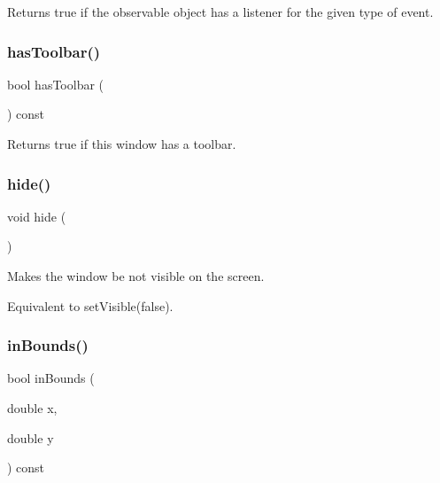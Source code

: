 Returns true if the observable object has a listener for the given type of event. 

\mbox{\label{classsgl_1_1GWindow_af69d0a7ce84cbbef65e40d861ef097c5}} 
\subsubsection{\texorpdfstring{has\+Toolbar()}{hasToolbar()}}
{\footnotesize\ttfamily bool has\+Toolbar (\begin{DoxyParamCaption}{ }\end{DoxyParamCaption}) const\hspace{0.3cm}{\ttfamily [virtual]}}



Returns true if this window has a toolbar. 

\mbox{\label{classsgl_1_1GWindow_ade42eb4da4eb77db85a8d1e4b92e7be4}} 
\subsubsection{\texorpdfstring{hide()}{hide()}}
{\footnotesize\ttfamily void hide (\begin{DoxyParamCaption}{ }\end{DoxyParamCaption})\hspace{0.3cm}{\ttfamily [virtual]}}



Makes the window be not visible on the screen. 

Equivalent to set\+Visible(false). \mbox{\label{classsgl_1_1GWindow_afc480f652b8c5f1fb255e2269ce68879}} 
\subsubsection{\texorpdfstring{in\+Bounds()}{inBounds()}}
{\footnotesize\ttfamily bool in\+Bounds (\begin{DoxyParamCaption}\item[{double}]{x,  }\item[{double}]{y }\end{DoxyParamCaption}) const\hspace{0.3cm}{\ttfamily [virtual]}}



